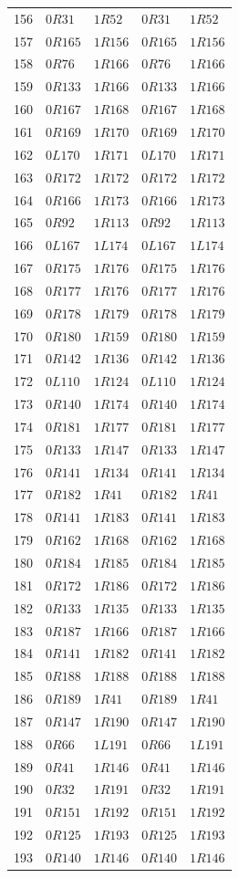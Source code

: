 {\begin{longtable}{@{}rllll@{}}
156 & $0R31$ & $1R52$ & $0R31$ & $1R52$\\
157 & $0R165$ & $1R156$ & $0R165$ & $1R156$\\
158 & $0R76$ & $1R166$ & $0R76$ & $1R166$\\
159 & $0R133$ & $1R166$ & $0R133$ & $1R166$\\
160 & $0R167$ & $1R168$ & $0R167$ & $1R168$\\
161 & $0R169$ & $1R170$ & $0R169$ & $1R170$\\
162 & $0L170$ & $1R171$ & $0L170$ & $1R171$\\
163 & $0R172$ & $1R172$ & $0R172$ & $1R172$\\
164 & $0R166$ & $1R173$ & $0R166$ & $1R173$\\
165 & $0R92$ & $1R113$ & $0R92$ & $1R113$\\
166 & $0L167$ & $1L174$ & $0L167$ & $1L174$\\
167 & $0R175$ & $1R176$ & $0R175$ & $1R176$\\
168 & $0R177$ & $1R176$ & $0R177$ & $1R176$\\
169 & $0R178$ & $1R179$ & $0R178$ & $1R179$\\
170 & $0R180$ & $1R159$ & $0R180$ & $1R159$\\
171 & $0R142$ & $1R136$ & $0R142$ & $1R136$\\
172 & $0L110$ & $1R124$ & $0L110$ & $1R124$\\
173 & $0R140$ & $1R174$ & $0R140$ & $1R174$\\
174 & $0R181$ & $1R177$ & $0R181$ & $1R177$\\
175 & $0R133$ & $1R147$ & $0R133$ & $1R147$\\
176 & $0R141$ & $1R134$ & $0R141$ & $1R134$\\
177 & $0R182$ & $1R41$ & $0R182$ & $1R41$\\
178 & $0R141$ & $1R183$ & $0R141$ & $1R183$\\
179 & $0R162$ & $1R168$ & $0R162$ & $1R168$\\
180 & $0R184$ & $1R185$ & $0R184$ & $1R185$\\
181 & $0R172$ & $1R186$ & $0R172$ & $1R186$\\
182 & $0R133$ & $1R135$ & $0R133$ & $1R135$\\
183 & $0R187$ & $1R166$ & $0R187$ & $1R166$\\
184 & $0R141$ & $1R182$ & $0R141$ & $1R182$\\
185 & $0R188$ & $1R188$ & $0R188$ & $1R188$\\
186 & $0R189$ & $1R41$ & $0R189$ & $1R41$\\
187 & $0R147$ & $1R190$ & $0R147$ & $1R190$\\
188 & $0R66$ & $1L191$ & $0R66$ & $1L191$\\
189 & $0R41$ & $1R146$ & $0R41$ & $1R146$\\
190 & $0R32$ & $1R191$ & $0R32$ & $1R191$\\
191 & $0R151$ & $1R192$ & $0R151$ & $1R192$\\
192 & $0R125$ & $1R193$ & $0R125$ & $1R193$\\
193 & $0R140$ & $1R146$ & $0R140$ & $1R146$\\
\bottomrule
\end{longtable}
}
